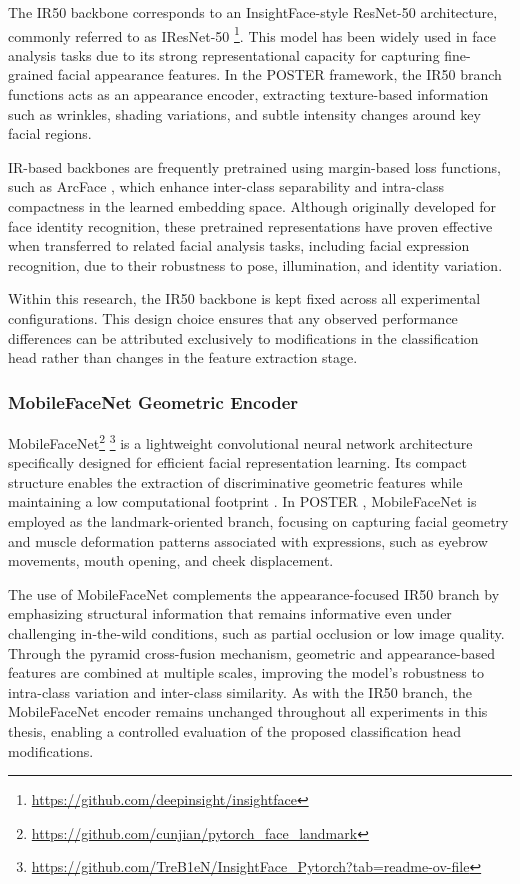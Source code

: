 The IR50 backbone corresponds to an InsightFace-style ResNet-50 architecture, commonly referred to as IResNet-50 \footnote{\url{https://github.com/deepinsight/insightface}}. This model has been widely used in face analysis tasks \cite{deng_arcface_2022} 
\cite{vedaldi_sub-center_2020} due to its strong representational capacity for capturing fine-grained facial appearance features. In the \gls{POSTER} \cite{zheng_poster_2022} framework, the IR50 branch functions acts as an appearance encoder, extracting texture-based information such as wrinkles, shading variations, and subtle intensity changes around key facial regions.


IR-based backbones are frequently pretrained using margin-based loss functions, such as ArcFace \cite{deng_arcface_2022}, which enhance inter-class separability and intra-class compactness in the learned embedding space. Although originally developed for face identity recognition, these pretrained representations have proven effective when transferred to related facial analysis tasks, including facial expression recognition, due to their robustness to pose, illumination, and identity variation.


Within this research, the IR50 backbone is kept fixed across all experimental configurations. This design choice ensures that any observed performance differences can be attributed exclusively to modifications in the classification head rather than changes in the feature extraction stage.


\subsubsection{MobileFaceNet Geometric Encoder}

MobileFaceNet\footnote{\url{https://github.com/cunjian/pytorch_face_landmark}} \footnote{\url{https://github.com/TreB1eN/InsightFace_Pytorch?tab=readme-ov-file}} is a lightweight convolutional neural network architecture specifically designed for efficient facial representation learning. Its compact structure enables the extraction of discriminative geometric features while maintaining a low computational footprint \cite{tan_efficientnet_2020} 
\cite{chen_mobilefacenets_2018}. In \gls{POSTER} \cite{zheng_poster_2022}, MobileFaceNet is employed as the landmark-oriented branch, focusing on capturing facial geometry and muscle deformation patterns associated with expressions, such as eyebrow movements, mouth opening, and cheek displacement.


The use of MobileFaceNet complements the appearance-focused IR50 branch by emphasizing structural information that remains informative even under challenging in-the-wild conditions, such as partial occlusion or low image quality. Through the pyramid cross-fusion mechanism, geometric and appearance-based features are combined at multiple scales, improving the model’s robustness to intra-class variation and inter-class similarity. As with the IR50 branch, the MobileFaceNet encoder remains unchanged throughout all experiments in this thesis, enabling a controlled evaluation of the proposed classification head modifications.

